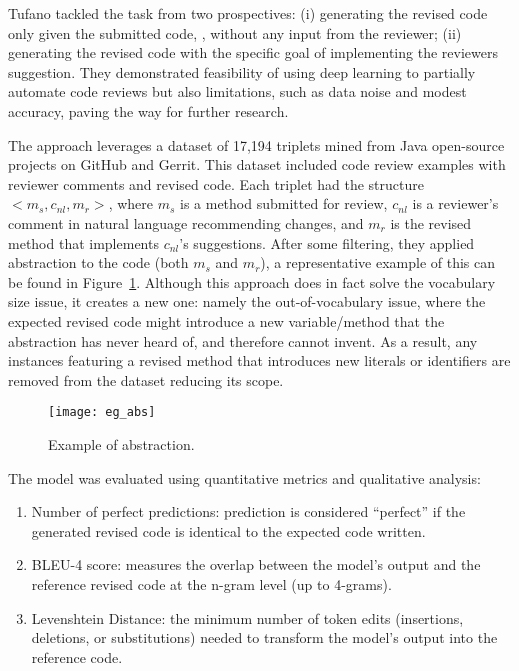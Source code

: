 Tufano \etal \cite{tufano:icse2021} tackled the task from two prospectives: (i)
generating the revised code only given the submitted code, \ie, without any
input from the reviewer; (ii) generating the revised code with the specific
goal of implementing the reviewers suggestion. They demonstrated feasibility of
using deep learning to partially automate code reviews but also limitations,
such as data noise and modest accuracy, paving the way for further research.

The approach leverages a dataset of 17,194 triplets mined from Java open-source
projects on GitHub and Gerrit. This dataset included code review examples with
reviewer comments and revised code. Each triplet had the structure $<m_s,
    c_{nl}, m_r>$, where $m_s$ is a method submitted for review, $c_{nl}$ is a
reviewer’s comment in natural language recommending changes, and $m_r$ is the
revised method that implements $c_{nl}$’s suggestions.
After some filtering, they applied abstraction to the code (both $m_s$ and
$m_r$), a representative example of this can be found in
Figure~\ref{fig:abstraction}. Although this approach does in fact solve the
vocabulary size issue, it creates a new one: namely the out-of-vocabulary
issue, where the expected revised code might introduce a new variable/method
that the abstraction has never heard of, and therefore cannot invent. As a
result, any instances featuring a revised method that introduces new literals
or identifiers are removed from the dataset reducing its scope.

\begin{figure}[ht]
    \centering
    \texttt{[image: eg\_abs]}
    \caption{Example of abstraction.}
    \label{fig:abstraction}
    \vspace{-0.1cm}
\end{figure}

The model was evaluated using quantitative metrics and qualitative analysis:
\begin{enumerate}
    \item Number of perfect predictions: prediction is considered ``perfect'' if the
          generated revised code is identical to the expected code written.
    \item BLEU-4 score: measures the overlap between the model's output and the reference
          revised code at the n-gram level (up to 4-grams).
    \item Levenshtein Distance: the minimum number of token edits (insertions, deletions,
          or substitutions) needed to transform the model's output into the reference
          code.
\end{enumerate}

